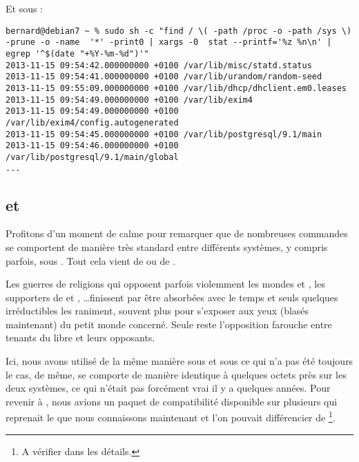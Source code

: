 Et sous \linux{}:

\begin{lstlisting}[caption=problèmes de droits part II et fin du pire pour Debian]
bernard@debian7 ~ % sudo sh -c "find / \( -path /proc -o -path /sys \) -prune -o -name  '*' -print0 | xargs -0  stat --printf='%z %n\n' | egrep '^$(date "+%Y-%m-%d")'"
2013-11-15 09:54:42.000000000 +0100 /var/lib/misc/statd.status
2013-11-15 09:54:41.000000000 +0100 /var/lib/urandom/random-seed
2013-11-15 09:55:09.000000000 +0100 /var/lib/dhcp/dhclient.em0.leases
2013-11-15 09:54:49.000000000 +0100 /var/lib/exim4
2013-11-15 09:54:49.000000000 +0100 /var/lib/exim4/config.autogenerated
2013-11-15 09:54:45.000000000 +0100 /var/lib/postgresql/9.1/main
2013-11-15 09:54:46.000000000 +0100 /var/lib/postgresql/9.1/main/global
...
\end{lstlisting}

\subsection{\POSIX{} et \GNU{}}
Profitons d'un moment de calme pour remarquer que de nombreuses commandes se comportent de manière très standard entre différents systèmes, y compris parfois, sous \msdos{}. Tout cela vient de \POSIX{} ou de \GNU{}.

Les guerres de religions qui opposent parfois violemment les mondes \BSD{} et \linux{}, les supporters de  et , \ldots finissent par être absorbées avec le temps et seuls quelques irréductibles les raniment, souvent plus pour s'exposer aux yeux (blasés maintenant) du petit monde concerné. Seule reste l'opposition farouche entre tenants du libre et leurs opposants.

Ici, nous avons utilisé  de la même manière sous \linux{} et sous \netbsd{} ce qui n'a pas été toujours le cas, de même, \sh{} se comporte de manière identique à quelques octets près sur les deux systèmes, ce qui n'était pas forcément vrai il y a quelques années. Pour revenir à , nous avions un paquet de compatibilité \GNU{} disponible sur plusieurs \BSD{} qui reprenait le  que nous connaissons maintenant et l'on pouvait différencier  de \footnote{A vérifier dans les détails.}.
